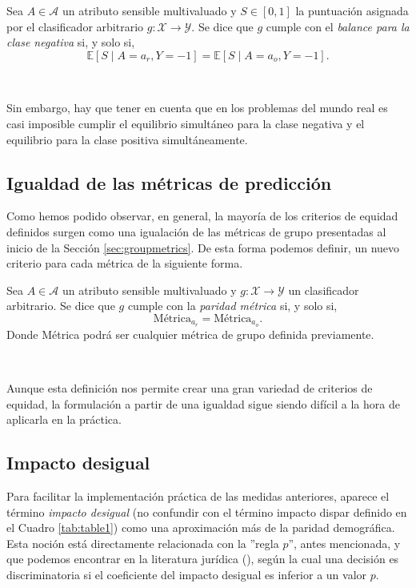 \documentclass[oneside,openright,titlepage,numbers=noenddot,openany,headinclude,footinclude=true,
cleardoublepage=empty,abstractoff,BCOR=5mm,paper=a4,fontsize=12pt,main=spanish]{scrreprt}
\begin{document}
\begin{definition}
Sea $A \in \mathcal{A}$ un atributo sensible multivaluado y $S\in [0,1]$ la puntuación asignada por el clasificador arbitrario $g\colon \mathcal{X} \to \mathcal{Y}$. Se dice que $g$ cumple con el \textit{balance para la clase negativa} si, y solo si, $$\mathbb{E}[S \mid A=a_r, Y=-1]=\mathbb{E}[S \mid A=a_o, Y=-1].$$
\end{definition}\

Sin embargo, hay que tener en cuenta que
en los problemas del mundo real es casi imposible cumplir el equilibrio simultáneo para la clase negativa y el equilibrio para la clase positiva simultáneamente.

\clearpage

\subsection{Igualdad de las métricas de predicción}

Como hemos podido observar, en general, la mayoría de los criterios de equidad definidos surgen como una igualación de las métricas de grupo presentadas al inicio de la Sección \ref{sec:groupmetrics}. De esta forma podemos definir, un nuevo criterio para cada métrica de la siguiente forma.\\

\begin{definition}\label{def:parmetr}
Sea $A \in \mathcal{A}$ un atributo sensible multivaluado y $g\colon \mathcal{X} \to \mathcal{Y}$ un clasificador arbitrario. Se dice que $g$ cumple con la \textit{paridad métrica} si, y solo si, $$\text{Métrica}_{a_r}=\text{Métrica}_{a_o}.$$
Donde Métrica podrá ser cualquier métrica de grupo definida previamente. 
\end{definition}\

Aunque esta definición nos permite crear una gran variedad de criterios de equidad, la formulación a partir de una igualdad sigue siendo difícil a la hora de aplicarla en la práctica. 

\subsection{Impacto desigual} \label{subsec:impactdesi}

Para facilitar la implementación práctica de las medidas anteriores, aparece el término \textit{impacto desigual} (no confundir con el término impacto dispar definido en el Cuadro \ref{tab:table1}) como una aproximación más de la paridad demográfica. Esta noción está directamente relacionada con la ''regla $p$'', antes mencionada, y que podemos encontrar en la literatura jurídica (\cite{prule2018}), según la cual una decisión es discriminatoria si el coeficiente del impacto desigual es inferior a un valor $p$.\\
\end{document}
